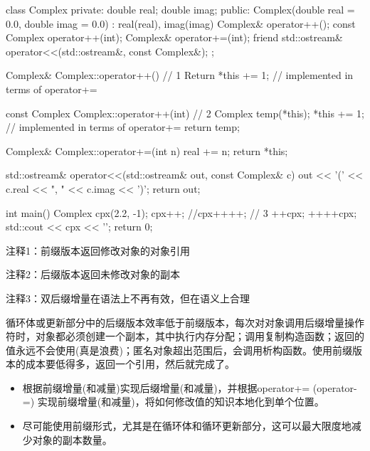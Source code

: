 
\begin{cpp}
class Complex {
private:
  double real;
  double imag;
public:
  Complex(double real = 0.0, double imag = 0.0) : real(real), imag(imag) {}
  Complex& operator++();
  const Complex operator++(int);
  Complex& operator+=(int);
  friend std::ostream& operator<<(std::ostream&, const Complex&);
};

Complex& Complex::operator++() { // 1
  Return *this += 1; // implemented in terms of operator+=
}

const Complex Complex::operator++(int) { // 2
  Complex temp(*this);
  *this += 1; // implemented in terms of operator+=
  return temp;
}

Complex& Complex::operator+=(int n) {
  real += n;
  return *this;
}

std::ostream& operator<<(std::ostream& out, const Complex& c) {
  out << '(' << c.real << ", " << c.imag << ')';
  return out;
}

int main() {
  Complex cpx(2.2, -1);
  cpx++;
  //cpx++++; // 3
  ++cpx;
  ++++cpx;
  std::cout << cpx << '\n';
  return 0;
}
\end{cpp}

{\footnotesize
注释1：前缀版本返回修改对象的对象引用

注释2：后缀版本返回未修改对象的副本

注释3：双后缀增量在语法上不再有效，但在语义上合理
}

循环体或更新部分中的后缀版本效率低于前缀版本，每次对对象调用后缀增量操作符时，对象都必须创建一个副本，其中执行内存分配；调用复制构造函数；返回的值永远不会使用(真是浪费)；匿名对象超出范围后，会调用析构函数。使用前缀版本的成本要低得多，返回一个引用，然后就完成了。


\begin{itemize}
\item
根据前缀增量(和减量)实现后缀增量(和减量)，并根据operator+= (operator-=) 实现前缀增量(和减量)，将如何修改值的知识本地化到单个位置。

\item
尽可能使用前缀形式，尤其是在循环体和循环更新部分，这可以最大限度地减少对象的副本数量。
\end{itemize}







